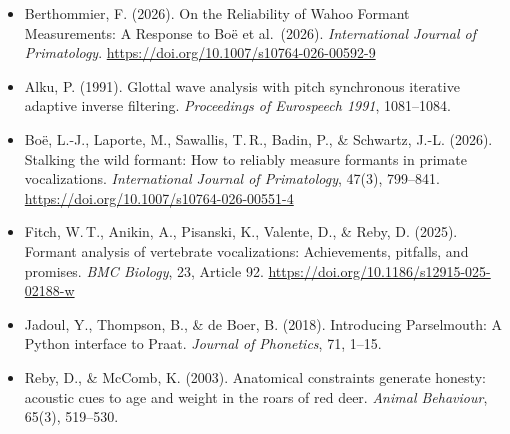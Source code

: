 \documentclass[11pt,a4paper]{article}
\begin{document}
\begin{itemize}
\item Berthommier, F. (2026). On the Reliability of Wahoo Formant
Measurements: A Response to Bo\"e et al.\ (2026). \emph{International
Journal of Primatology}.
\url{https://doi.org/10.1007/s10764-026-00592-9}
\item Alku, P. (1991). Glottal wave analysis with pitch synchronous
iterative adaptive inverse filtering. \emph{Proceedings of Eurospeech
1991}, 1081--1084.
\item Bo\"e, L.-J., Laporte, M., Sawallis, T.\,R., Badin, P., \&
Schwartz, J.-L. (2026). Stalking the wild formant: How to reliably
measure formants in primate vocalizations. \emph{International Journal
of Primatology}, 47(3), 799--841.
\url{https://doi.org/10.1007/s10764-026-00551-4}
\item Fitch, W.\,T., Anikin, A., Pisanski, K., Valente, D., \& Reby, D.
(2025). Formant analysis of vertebrate vocalizations: Achievements,
pitfalls, and promises. \emph{BMC Biology}, 23, Article 92.
\url{https://doi.org/10.1186/s12915-025-02188-w}
\item Jadoul, Y., Thompson, B., \& de Boer, B. (2018). Introducing
Parselmouth: A Python interface to Praat. \emph{Journal of Phonetics},
71, 1--15.
\item Reby, D., \& McComb, K. (2003). Anatomical constraints generate
honesty: acoustic cues to age and weight in the roars of red deer.
\emph{Animal Behaviour}, 65(3), 519--530.
\end{itemize}
\end{document}
